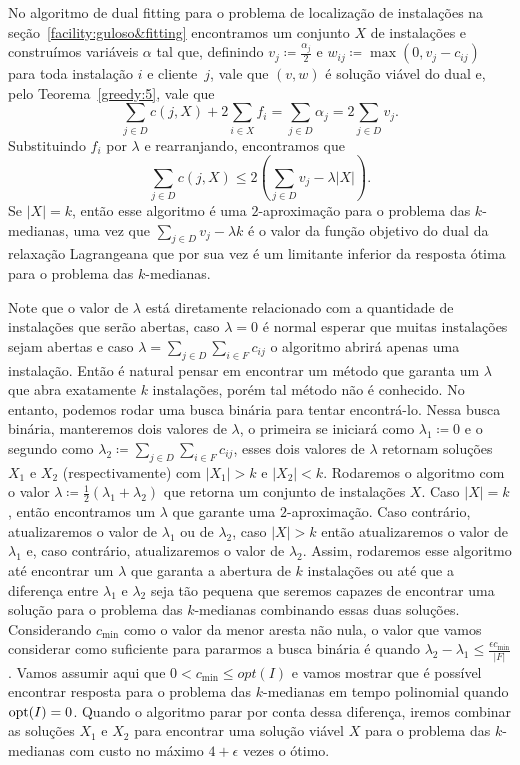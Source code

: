 No algoritmo de dual fitting para o problema de localização de instalações na seção~\ref{facility:guloso&fitting} encontramos um conjunto $X$ de instalações e construímos variáveis $\alpha$ tal que, definindo $v_j \coloneqq \frac{\alpha_j}{2}$ e $w_{ij} \coloneqq \max(0,v_j - c_{ij})$ para toda instalação $i$ e cliente~$j$, vale que $(v, w)$ é solução viável do dual e, pelo Teorema~\ref{greedy:5}, vale que
\[\sum_{j \in D} c(j,X) + 2\sum_{i \in X} f_i = \sum_{j \in D} \alpha_j =  2\sum_{j\in D} v_j.\]
Substituindo $f_i$ por $\lambda$ e rearranjando, encontramos que
\[\sum_{j\in D} c(j,X) \leq 2\left(\sum_{j\in D}v_j - \lambda|X|\right).\]
Se $|X| = k$, então esse algoritmo é uma $2$-aproximação para o problema das $k$-medianas, uma vez que $ \sum_{j\in D} v_j - \lambda k$ é o valor da função objetivo do dual da relaxação Lagrangeana que por sua vez é um limitante inferior da resposta ótima para o problema das $k$-medianas. 

Note que o valor de $\lambda$ está diretamente relacionado com a quantidade de instalações que serão abertas, caso $\lambda = 0$ é normal esperar que muitas instalações sejam abertas e caso $\lambda = \sum_{j \in D}\sum_{i \in F}c_{ij}$ o algoritmo abrirá apenas uma instalação. Então é natural pensar em encontrar um método que garanta um $\lambda$ que abra exatamente $k$ instalações, porém tal método não é conhecido. No entanto, podemos rodar uma busca binária para tentar encontrá-lo. Nessa busca binária, manteremos dois valores de $\lambda$, o primeira se iniciará como $\lambda_1 \coloneqq 0$ e o segundo como $\lambda_2 \coloneqq \sum_{j \in D}\sum_{i \in F}c_{ij}$, esses dois valores de $\lambda$ retornam soluções $X_1$ e $X_2$ (respectivamente) com $|X_1| > k$ e $|X_2| < k$. Rodaremos o algoritmo com o valor $\lambda \coloneqq \frac{1}{2}\left(\lambda_1 + \lambda_2 \right)$ que retorna um conjunto de instalações $X$. Caso $|X| = k$, então encontramos um $\lambda$ que garante uma $2$-aproximação. Caso contrário, atualizaremos o valor de $\lambda_1$ ou de $\lambda_2$, caso $|X| > k$ então atualizaremos o valor de $\lambda_1$ e, caso contrário, atualizaremos o valor de $\lambda_2$. Assim, rodaremos esse algoritmo até encontrar um $\lambda$ que garanta a abertura de $k$ instalações ou até que a diferença entre $\lambda_1$ e $\lambda_2$ seja tão pequena que seremos capazes de encontrar uma solução para o problema das $k$-medianas combinando essas duas soluções. Considerando $c_{\min}$ como o valor da menor aresta não nula, o valor que vamos considerar como suficiente para pararmos a busca binária é quando $\lambda_2 - \lambda_1 \leq \frac{\epsilon c_{\min}}{|F|}$. Vamos assumir aqui que $0 < c_{\min} \leq opt(I)$ e vamos mostrar que é possível encontrar resposta para o problema das $k$-medianas em tempo polinomial quando $\mathrm{opt}(I)=0$. Quando o algoritmo parar por conta dessa diferença, iremos combinar as soluções $X_1$ e $X_2$ para encontrar uma solução viável $X$ para o problema das $k$-medianas com custo no máximo $4 + \epsilon$ vezes o ótimo.

